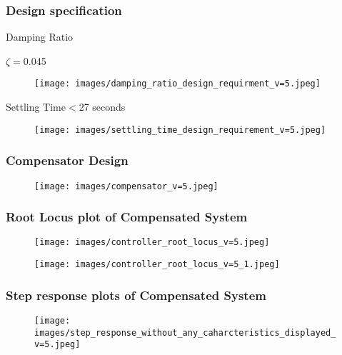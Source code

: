 \documentclass[notitlepage]{article}
\begin{document}

\newpage
\subsubsection{Design specification}
 \center Damping Ratio

\vspace{1mm}
$\zeta$$=$0.045
\begin{figure}[h!]
    \centering
    \texttt{[image: images/damping\_ratio\_design\_requirment\_v=5.jpeg]}
     \label{fig:my_label}
 \end{figure}

\newpage
Settling Time$<$27 seconds
\begin{figure}[h!]
    \centering
    \texttt{[image: images/settling\_time\_design\_requirement\_v=5.jpeg]}
     \label{fig:my_label}
 \end{figure}

\newpage
\subsubsection{Compensator Design}
\begin{figure}[h!]
    \centering
    \texttt{[image: images/compensator\_v=5.jpeg]}
     \label{fig:my_label}
 \end{figure}

\newpage
\subsubsection{Root Locus plot of Compensated System}
\begin{figure}[h!]
    \centering
    \texttt{[image: images/controller\_root\_locus\_v=5.jpeg]}
     \label{fig:my_label}
 \end{figure}

 \begin{figure}[h!]
    \centering
    \texttt{[image: images/controller\_root\_locus\_v=5\_1.jpeg]}
     \label{fig:my_label}
 \end{figure}

 \newpage

 \subsubsection{Step response plots of Compensated System}
\begin{figure}[h!]
    \centering
    \texttt{[image: images/step\_response\_without\_any\_caharcteristics\_displayed\_v=5.jpeg]}
     \label{fig:my_label}
 \end{figure}
\end{document}
